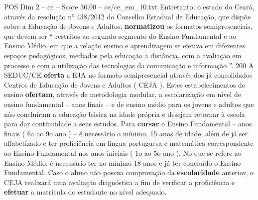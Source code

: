 \begin{textsample}{POS Dim 2 – ce – Score 36.00 – ce/ce\_em\_10.txt}
Entretanto, o estado do Ceará, através da resolução n{\EmojiFont °} 438/2012 do Conselho Estadual de Educação, que dispõe sobre a Educação de Jovens e Adultos, \textbf{normatizou} os formatos semipresenciais, que devem ser “ restritos ao segundo segmento do Ensino Fundamental e ao Ensino Médio, em que a relação ensino e aprendizagem se efetiva em diferentes espaços pedagógicos, mediados pela educação a distância, com a avaliação em processo e com a utilização das tecnologias da comunicação e informação ”. 200 A SEDUC/CE \textbf{oferta} a EJA no formato semipresencial através dos já consolidados Centros de Educação de Jovens e Adultos ( CEJA ).
Estes estabelecimentos de ensino \textbf{ofertam}, através de metodologia modular, a escolarização em nível de ensino fundamental – anos finais – e de ensino médio para os jovens e adultos que não concluíram a educação básica na idade própria e desejam retornar à escola para dar continuidade a seus estudos.
Para \textbf{cursar} o Ensino Fundamental – anos finais ( 6a ao 9o ano ) – é necessário o mínimo, 15 anos de idade, além de já ser alfabetizado e ter proficiência em língua portuguesa e matemática correspondente ao Ensino Fundamental nos anos iniciais ( 1o ao 5o ano ).
No que se refere ao Ensino Médio, é necessário ter no mínimo 18 anos e já ter concluído o Ensino Fundamental.
Caso o aluno não possua comprovação da \textbf{escolaridade} anterior, o CEJA realizará uma avaliação diagnóstica a fim de verificar a proficiência e \textbf{efetuar} a matrícula do estudante no nível adequado.

\end{textsample}
